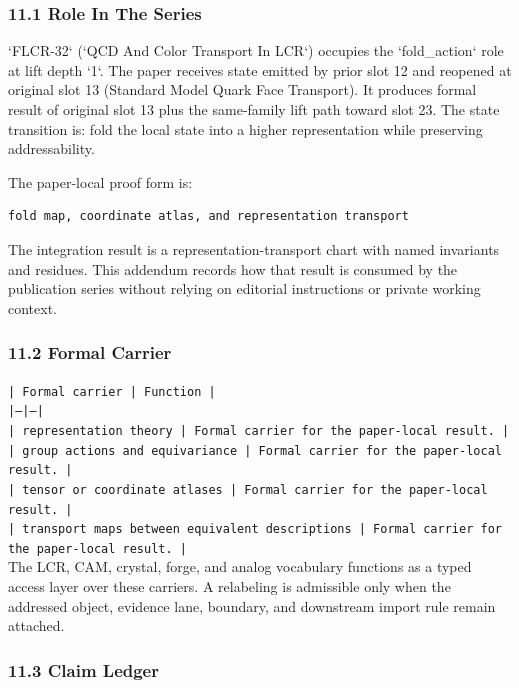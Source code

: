 \documentclass[11pt]{article}
\begin{document}
\subsubsection*{11.1 Role In The Series}

`FLCR-32` (`QCD And Color Transport In LCR`) occupies the `fold\_action` role at lift depth `1`.
The paper receives state emitted by prior slot 12 and reopened at original slot 13 (Standard Model Quark Face Transport). It produces formal result of original slot 13 plus the same-family lift path toward slot 23. The state transition is:
fold the local state into a higher representation while preserving addressability.

The paper-local proof form is:

\begin{verbatim}
fold map, coordinate atlas, and representation transport
\end{verbatim}

The integration result is a representation-transport chart with named invariants and residues. This addendum records how that result is
consumed by the publication series without relying on editorial instructions or
private working context.

\subsubsection*{11.2 Formal Carrier}

\noindent\texttt{| Formal carrier | Function |}\\
\noindent\texttt{|---|---|}\\
\noindent\texttt{| representation theory | Formal carrier for the paper-local result. |}\\
\noindent\texttt{| group actions and equivariance | Formal carrier for the paper-local result. |}\\
\noindent\texttt{| tensor or coordinate atlases | Formal carrier for the paper-local result. |}\\
\noindent\texttt{| transport maps between equivalent descriptions | Formal carrier for the paper-local result. |}\\

The LCR, CAM, crystal, forge, and analog vocabulary functions as a typed access
layer over these carriers. A relabeling is admissible only when the addressed
object, evidence lane, boundary, and downstream import rule remain attached.

\subsubsection*{11.3 Claim Ledger}
\end{document}

